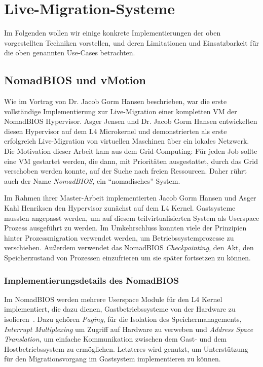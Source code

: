 \section{Live-Migration-Systeme}
\label{sec:live-migr-syst}
Im Folgenden wollen wir einige konkrete Implementierungen der oben
vorgestellten Techniken vorstellen, und deren Limitationen und
Einsatzbarkeit für die oben genannten Use-Cases betrachten.

\subsection{NomadBIOS und vMotion}
\label{sec:nomadbios--vmware}
Wie im Vortrag von Dr. Jacob Gorm Hansen beschrieben, war die erste
vollständige Implementierung zur Live-Migration einer kompletten VM
der NomadBIOS Hypervisor. Asger Jensen und Dr. Jacob Gorm Hansen
entwickelten diesen Hypervisor auf dem L4 Microkernel und
demonstrierten als erste erfolgreich Live-Migration von virtuellen
Maschinen über ein lokales Netzwerk. Die Motivation dieser Arbeit kam
aus dem Grid-Computing: Für jeden Job sollte eine VM gestartet werden,
die dann, mit Prioritäten ausgestattet, durch das Grid verschoben
werden konnte, auf der Suche nach freien Ressourcen. Daher rührt auch
der Name \emph{NomadBIOS}, ein "`nomadisches"' System.

Im Rahmen ihrer Master-Arbeit implementierten Jacob Gorm Hansen und
Asger Kahl Henriksen den Hypervisor zunächst auf dem L4
Kernel. Gastsysteme mussten angepasst werden, um auf diesem
teilvirtualisierten System als Userspace Prozess ausgeführt zu
werden. Im Umkehrschluss konnten viele der Prinzipien hinter
Prozessmigration verwendet werden, um Betriebssystemprozesse zu
verschieben. Außerdem verwendet das NomadBIOS \emph{Checkpointing},
den Akt, den Speicherzustand von Prozessen einzufrieren um sie später
fortsetzen zu können.

\subsubsection{Implementierungsdetails des NomadBIOS}
\label{sec:impl-des-nomadb}
Im NomadBIOS werden mehrere Userspace Module für den L4 Kernel
implementiert, die dazu dienen, Gastbetriebssysteme von der Hardware
zu isolieren~\cite{hansen2002nomadic}. Dazu gehören \emph{Paging}, für
die Isolation des Speichermanagements, \emph{Interrupt Multiplexing}
um Zugriff auf Hardware zu verweben und \emph{Address Space
  Translation}, um einfache Kommunikation zwischen dem Gast- und dem
Hostbetriebssystem zu ermöglichen. Letzteres wird genutzt, um
Unterstützung für den Migrationsvorgang im Gastsystem implementieren
zu können.

